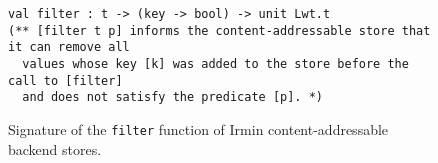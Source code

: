\begin{figure}[ht]
  \caption{Signature of the \texttt{filter} function of Irmin content-addressable backend stores.}
  \label{lst:filter-sig}

  \centering
  \vspace{-1em}
  \begin{verbatim}
val filter : t -> (key -> bool) -> unit Lwt.t
(** [filter t p] informs the content-addressable store that it can remove all
  values whose key [k] was added to the store before the call to [filter]
  and does not satisfy the predicate [p]. *)
    \end{verbatim}
\end{figure}
